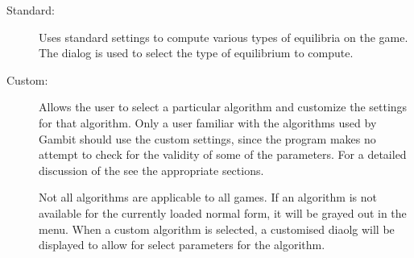 \begin{description}
\item[Standard:] Uses standard settings to compute various types of
equilibria on the game.  The  dialog is used to select the type of
equilibrium to compute.
\item[Custom:] Allows the user to select a particular algorithm and
customize the settings for that algorithm.  Only a user familiar with
the algorithms used by Gambit should use the custom settings, since
the program makes no attempt to check for the validity of some of the
parameters.  For a detailed discussion of the 
 see the appropriate sections.

Not all algorithms are applicable to all games.  If an algorithm is
not available for the currently loaded normal form, it will be grayed
out in the menu.  When a custom algorithm is selected, a customised
 diaolg will be
displayed to allow for select parameters for the algorithm.  


\end{description}
